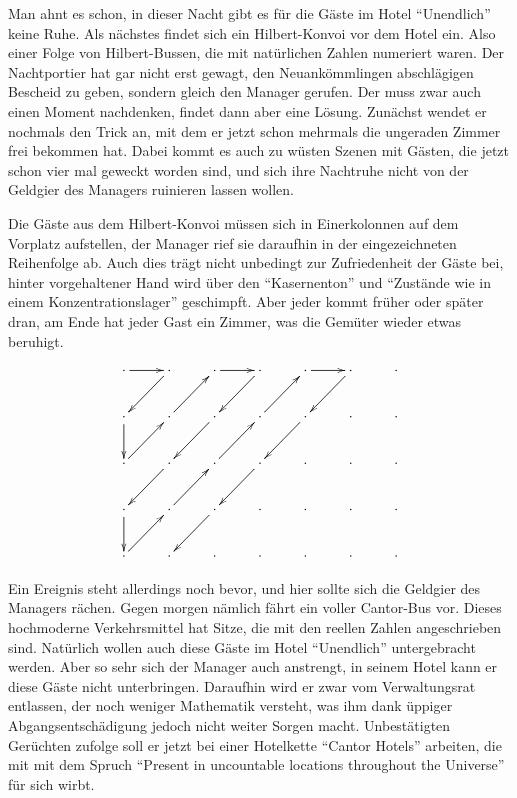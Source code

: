 Man ahnt es schon, in dieser Nacht gibt es für die Gäste im Hotel
``Unendlich'' keine Ruhe. Als nächstes findet sich ein Hilbert-Konvoi
vor dem Hotel ein. Also einer Folge von Hilbert-Bussen, die mit natürlichen
Zahlen numeriert waren. Der Nachtportier hat gar nicht erst gewagt,
den Neuankömmlingen abschlägigen Bescheid zu geben, sondern gleich
den Manager gerufen. Der muss zwar auch einen Moment nachdenken, findet
dann aber eine Lösung. Zunächst wendet er nochmals den Trick an,
mit dem er jetzt schon mehrmals die ungeraden Zimmer frei bekommen hat.
Dabei kommt es auch zu wüsten Szenen mit Gästen, die jetzt schon vier mal
geweckt worden sind, und sich ihre Nachtruhe nicht von der Geldgier des
Managers ruinieren lassen wollen.

Die Gäste aus dem Hilbert-Konvoi müssen sich in Einerkolonnen auf
dem Vorplatz aufstellen, der Manager rief sie daraufhin in der
eingezeichneten Reihenfolge ab. Auch dies trägt nicht  unbedingt
zur Zufriedenheit der Gäste bei, hinter vorgehaltener Hand wird
über den ``Kasernenton'' und ``Zustände wie in einem Konzentrationslager''
geschimpft.
Aber jeder kommt früher oder später dran,
am Ende hat jeder Gast ein Zimmer, was die Gemüter wieder
etwas beruhigt.

\[
\xymatrix{
\ar[r]
\cdot	     &\cdot\ar[dl] &\cdot\ar[r] &\cdot\ar[dl]  &\cdot\ar[r] &\cdot\ar[dl] &\cdot
\\
\cdot\ar[d]  &\cdot\ar[ur] &\cdot\ar[dl] &\cdot\ar[ur] &\cdot\ar[dl]&\cdot        &\cdot
\\
\cdot\ar[ur] &\cdot\ar[dl] &\cdot\ar[ur] &\cdot\ar[dl] &\cdot       &\cdot        &\cdot
\\
\cdot\ar[d]  &\cdot\ar[ur] &\cdot\ar[dl] &\cdot        &\cdot       &\cdot        &\cdot
\\
\cdot\ar[ur] &\cdot        &\cdot        &\cdot        &\cdot       &\cdot        &\cdot
}
\]

Ein Ereignis steht allerdings noch bevor, und hier sollte sich die
Geldgier des Managers rächen. Gegen morgen nämlich fährt
ein voller Cantor-Bus vor. Dieses hochmoderne Verkehrsmittel hat Sitze,
%
die mit den reellen Zahlen angeschrieben sind. Natürlich wollen auch
diese Gäste im Hotel ``Unendlich'' untergebracht werden. Aber so sehr
sich der Manager auch anstrengt, in seinem Hotel kann er diese
Gäste nicht unterbringen. Daraufhin wird er zwar vom Verwaltungsrat
entlassen, der noch weniger Mathematik versteht, was ihm dank üppiger
Abgangsentschädigung jedoch nicht weiter Sorgen macht. Unbestätigten
Gerüchten zufolge soll er jetzt bei einer Hotelkette ``Cantor Hotels''
arbeiten, die mit mit dem Spruch ``Present in uncountable locations
throughout the Universe'' für sich wirbt.

